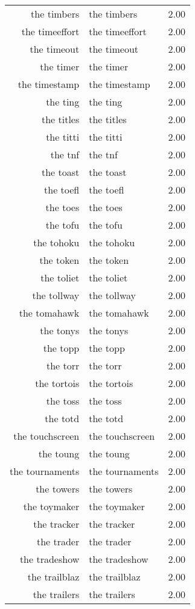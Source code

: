 \begin{table}[ht]
\begin{tabular}{rlr}
  the timbers & the timbers & 2.00 \\ 
  the timeeffort & the timeeffort & 2.00 \\ 
  the timeout & the timeout & 2.00 \\ 
  the timer & the timer & 2.00 \\ 
  the timestamp & the timestamp & 2.00 \\ 
  the ting & the ting & 2.00 \\ 
  the titles & the titles & 2.00 \\ 
  the titti & the titti & 2.00 \\ 
  the tnf & the tnf & 2.00 \\ 
  the toast & the toast & 2.00 \\ 
  the toefl & the toefl & 2.00 \\ 
  the toes & the toes & 2.00 \\ 
  the tofu & the tofu & 2.00 \\ 
  the tohoku & the tohoku & 2.00 \\ 
  the token & the token & 2.00 \\ 
  the toliet & the toliet & 2.00 \\ 
  the tollway & the tollway & 2.00 \\ 
  the tomahawk & the tomahawk & 2.00 \\ 
  the tonys & the tonys & 2.00 \\ 
  the topp & the topp & 2.00 \\ 
  the torr & the torr & 2.00 \\ 
  the tortois & the tortois & 2.00 \\ 
  the toss & the toss & 2.00 \\ 
  the totd & the totd & 2.00 \\ 
  the touchscreen & the touchscreen & 2.00 \\ 
  the toung & the toung & 2.00 \\ 
  the tournaments & the tournaments & 2.00 \\ 
  the towers & the towers & 2.00 \\ 
  the toymaker & the toymaker & 2.00 \\ 
  the tracker & the tracker & 2.00 \\ 
  the trader & the trader & 2.00 \\ 
  the tradeshow & the tradeshow & 2.00 \\ 
  the trailblaz & the trailblaz & 2.00 \\ 
  the trailers & the trailers & 2.00 \\ 

\end{tabular}
\end{table}
